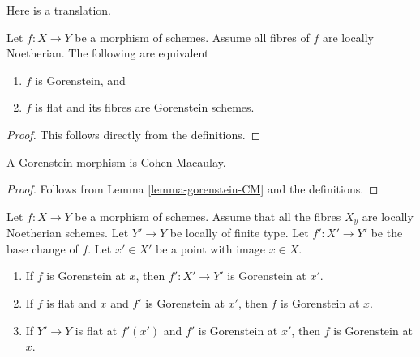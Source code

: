 \noindent
Here is a translation.

\begin{lemma}
\label{lemma-gorenstein-morphism}
Let $f : X \to Y$ be a morphism of schemes.
Assume all fibres of $f$ are locally Noetherian.
The following are equivalent
\begin{enumerate}
\item $f$ is Gorenstein, and
\item $f$ is flat and its fibres are Gorenstein schemes.
\end{enumerate}
\end{lemma}

\begin{proof}
This follows directly from the definitions.
\end{proof}

\begin{lemma}
\label{lemma-gorenstein-CM-morphism}
A Gorenstein morphism is Cohen-Macaulay.
\end{lemma}

\begin{proof}
Follows from Lemma \ref{lemma-gorenstein-CM} and the definitions.
\end{proof}

\begin{lemma}
\label{lemma-base-change-gorenstein}
Let $f : X \to Y$ be a morphism of schemes.
Assume that all the fibres $X_y$ are locally Noetherian schemes.
Let $Y' \to Y$ be locally of finite type. Let $f' : X' \to Y'$
be the base change of $f$.
Let $x' \in X'$ be a point with image $x \in X$.
\begin{enumerate}
\item If $f$ is Gorenstein at $x$, then
$f' : X' \to Y'$ is Gorenstein at $x'$.
\item If $f$ is flat and $x$ and $f'$ is Gorenstein at $x'$, then $f$
is Gorenstein at $x$.
\item If $Y' \to Y$ is flat at $f'(x')$ and $f'$ is Gorenstein at
$x'$, then $f$ is Gorenstein at $x$.
\end{enumerate}
\end{lemma}

